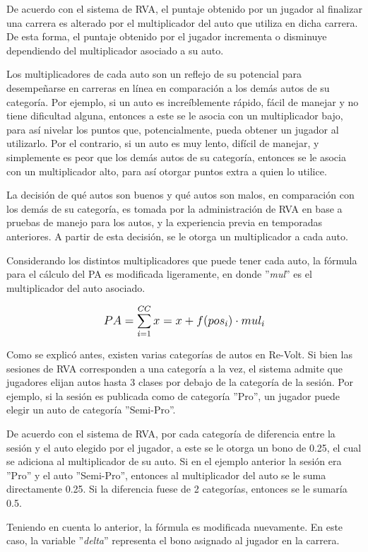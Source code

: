 De acuerdo con el sistema de RVA, el puntaje obtenido por un jugador al finalizar una carrera es alterado por el multiplicador del auto que utiliza en dicha carrera. De esta forma, el puntaje obtenido por el jugador incrementa o disminuye dependiendo del multiplicador asociado a su auto.

Los multiplicadores de cada auto son un reflejo de su potencial para desempeñarse en carreras en línea en comparación a los demás autos de su categoría. Por ejemplo, si un auto es increíblemente rápido, fácil de manejar y no tiene dificultad alguna, entonces a este se le asocia con un multiplicador bajo, para así nivelar los puntos que, potencialmente, pueda obtener un jugador al utilizarlo. Por el contrario, si un auto es muy lento, difícil de manejar, y simplemente es peor que los demás autos de su categoría, entonces se le asocia con un multiplicador alto, para así otorgar puntos extra a quien lo utilice.

La decisión de qué autos son buenos y qué autos son malos, en comparación con los demás de su categoría, es tomada por la administración de RVA en base a pruebas de manejo para los autos, y la experiencia previa en temporadas anteriores. A partir de esta decisión, se le otorga un multiplicador a cada auto.

Considerando los distintos multiplicadores que puede tener cada auto, la fórmula para el cálculo del PA es modificada ligeramente, en donde ''\textit{mul}'' es el multiplicador del auto asociado.

\[
\mathlarger{{PA} = \sum_{i=1}^{CC}x=x+f(pos_i) \cdot mul_i}
\]

Como se explicó antes, existen varias categorías de autos en Re-Volt. Si bien las sesiones de RVA corresponden a una categoría a la vez, el sistema admite que jugadores elijan autos hasta 3 clases por debajo de la categoría de la sesión. Por ejemplo, si la sesión es publicada como de categoría ''Pro'', un jugador puede elegir un auto de categoría ''Semi-Pro''.

De acuerdo con el sistema de RVA, por cada categoría de diferencia entre la sesión y el auto elegido por el jugador, a este se le otorga un bono de 0.25, el cual se adiciona al multiplicador de su auto. Si en el ejemplo anterior la sesión era ''Pro'' y el auto ''Semi-Pro'', entonces al multiplicador del auto se le suma directamente 0.25. Si la diferencia fuese de 2 categorías, entonces se le sumaría 0.5.

Teniendo en cuenta lo anterior, la fórmula es modificada nuevamente. En este caso, la variable ''\textit{delta}'' representa el bono asignado al jugador en la carrera.

